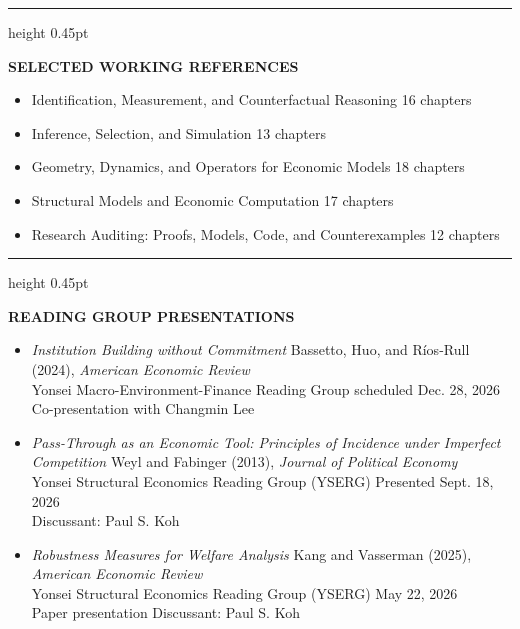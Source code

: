 \documentclass[11pt,letterpaper]{article}
\newcommand{\cvsection}[1]{%
  \par\vspace{0.24in}%
  {\color{cvgray}\hrule height 0.45pt}
  \vspace{0.16in}%
  {\color{cvgray}\fontsize{9.2}{11}\selectfont\bfseries\MakeUppercase{#1}}%
  \par\vspace{0.11in}%
}
\newenvironment{cvitems}{%
  \begin{itemize}[label={\textcolor{cvgray}{--}},leftmargin=0.28in,labelsep=0.09in,itemsep=0.105in,topsep=0pt,parsep=0pt,partopsep=0pt]
}{\end{itemize}}
\begin{document}
\cvsection{Selected Working References}
\begin{cvitems}
  \item Identification, Measurement, and Counterfactual Reasoning \textbullet{} 16 chapters
  \item Inference, Selection, and Simulation \textbullet{} 13 chapters
  \item Geometry, Dynamics, and Operators for Economic Models \textbullet{} 18 chapters
  \item Structural Models and Economic Computation \textbullet{} 17 chapters
  \item Research Auditing: Proofs, Models, Code, and Counterexamples \textbullet{} 12 chapters
\end{cvitems}

\cvsection{Reading Group Presentations}
\begin{cvitems}
  \item \textit{Institution Building without Commitment} \textbullet{} Bassetto, Huo, and R\'{i}os-Rull (2024), \textit{American Economic Review}\\
  Yonsei Macro-Environment-Finance Reading Group \textbullet{} scheduled Dec. 28, 2026\\
  Co-presentation with Changmin Lee

  \item \textit{Pass-Through as an Economic Tool: Principles of Incidence under Imperfect Competition} \textbullet{} Weyl and Fabinger (2013), \textit{Journal of Political Economy}\\
  Yonsei Structural Economics Reading Group (YSERG) \textbullet{} Presented Sept. 18, 2026\\
  Discussant: Paul S. Koh

  \item \textit{Robustness Measures for Welfare Analysis} \textbullet{} Kang and Vasserman (2025), \textit{American Economic Review}\\
  Yonsei Structural Economics Reading Group (YSERG) \textbullet{} May 22, 2026\\
  Paper presentation \textbullet{} Discussant: Paul S. Koh
\end{cvitems}
\end{document}
